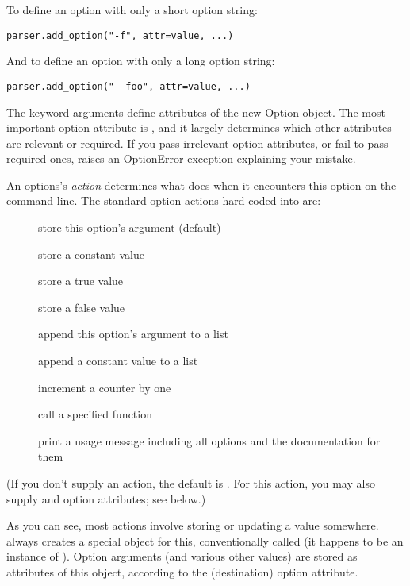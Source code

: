 To define an option with only a short option string:
\begin{verbatim}
parser.add_option("-f", attr=value, ...)
\end{verbatim}

And to define an option with only a long option string:
\begin{verbatim}
parser.add_option("--foo", attr=value, ...)
\end{verbatim}

The keyword arguments define attributes of the new Option object.  The
most important option attribute is , and it largely determines
which other attributes are relevant or required.  If you pass irrelevant
option attributes, or fail to pass required ones,  raises an
OptionError exception explaining your mistake.

An options's \emph{action} determines what  does when it encounters this
option on the command-line.  The standard option actions hard-coded into
 are:
\begin{description}
\item[]
store this option's argument (default)
\item[]
store a constant value
\item[]
store a true value
\item[]
store a false value
\item[]
append this option's argument to a list
\item[]
append a constant value to a list
\item[]
increment a counter by one
\item[]
call a specified function
\item[]
print a usage message including all options and the
documentation for them
\end{description}

(If you don't supply an action, the default is .  For this
action, you may also supply  and  option attributes; see
below.)

As you can see, most actions involve storing or updating a value
somewhere.   always creates a special object for this,
conventionally called  (it happens to be an instance of
).  Option arguments (and various other values) are
stored as attributes of this object, according to the 
(destination) option attribute.


